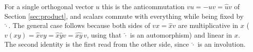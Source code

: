 For a single orthogonal vector $u$ this is the anticommutation $vu = -uv = \hat{u}v$ of Section \ref{sec:product}, and scalars commute with everything while being fixed by $\hat{\cdot}$. The general case follows because both sides of $vx = \hat{x}v$ are multiplicative in $x$ ($v(xy) = \hat{x}vy = \hat{x}\hat{y}v = \widehat{xy}\,v$, using that $\hat{\cdot}$ is an automorphism) and linear in $x$. The second identity is the first read from the other side, since $\hat{\cdot}$ is an involution.
